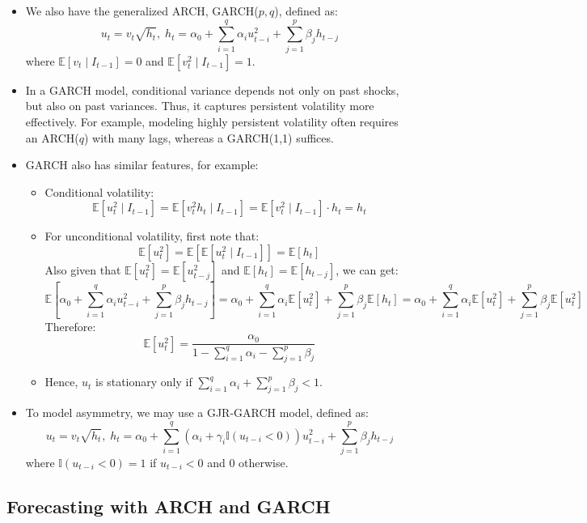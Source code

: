\documentclass[notitlepage]{article}
\begin{document}
\begin{itemize}
    \item We also have the generalized ARCH, GARCH(\(p,q\)), defined as:
    \[
    u_t = v_t\sqrt{h_t}, \;h_t = \alpha_0 + \sum_{i=1}^q \alpha_i u_{t-i}^2 + \sum_{j=1}^p \beta_j h_{t-j}
    \]
    where \(\mathbb{E}[v_t \mid I_{t-1}]=0\) and \(\mathbb{E}[v_t^2 \mid I_{t-1}]=1\).
    \item In a GARCH model, conditional variance depends not only on past shocks, but also on past variances. Thus, it captures persistent volatility more effectively. For example, modeling highly persistent volatility often requires an ARCH($q$) with many lags, whereas a GARCH(1,1) suffices.
    \item GARCH also has similar features, for example:
    \begin{itemize}
        \item Conditional volatility:
        \[
        \mathbb{E}[u_t^2 \mid I_{t-1}] = \mathbb{E}[v_t^2 h_t \mid I_{t-1}] = \mathbb{E}[v_t^2 \mid I_{t-1}] \cdot h_t = h_t
        \]
        \item For unconditional volatility, first note that:
        \[
        \mathbb{E}[u_t^2] = \mathbb{E}[\mathbb{E}[u_t^2 \mid I_{t-1}]] = \mathbb{E}[h_t]
        \]
        Also given that \(\mathbb{E}[u_t^2] = \mathbb{E}[u_{t-j}^2]\) and \(\mathbb{E}[h_t] = \mathbb{E}[h_{t-j}]\), we can get:
        \[
        \mathbb{E}\left[\alpha_0 + \sum_{i=1}^q \alpha_i u_{t-i}^2 + \sum_{j=1}^p \beta_j h_{t-j}\right] = \alpha_0 + \sum_{i=1}^q \alpha_i \mathbb{E}[u_t^2] + \sum_{j=1}^p \beta_j \mathbb{E}[h_t] = \alpha_0 + \sum_{i=1}^q \alpha_i \mathbb{E}[u_t^2] + \sum_{j=1}^p \beta_j \mathbb{E}[u_t^2]
        \]
        Therefore:
        \[
        \mathbb{E}[u_t^2] = \frac{\alpha_0}{1 - \sum_{i=1}^q \alpha_i - \sum_{j=1}^p \beta_j}
        \]
        \item Hence, \(u_t\) is stationary only if \(\sum_{i=1}^q \alpha_i + \sum_{j=1}^p \beta_j < 1\).
    \end{itemize}
    \item To model asymmetry, we may use a GJR-GARCH model, defined as:
    \[
    u_t = v_t\sqrt{h_t}, \; h_t = \alpha_0 + \sum_{i=1}^q (\alpha_i + \gamma_i \mathbb{I}(u_{t-i}<0)) u_{t-i}^2 + \sum_{j=1}^p \beta_j h_{t-j}
    \]
    where \(\mathbb{I}(u_{t-i}<0) = 1\) if \(u_{t-i}<0\) and 0 otherwise.
\end{itemize}

\subsection{Forecasting with ARCH and GARCH}
\end{document}
